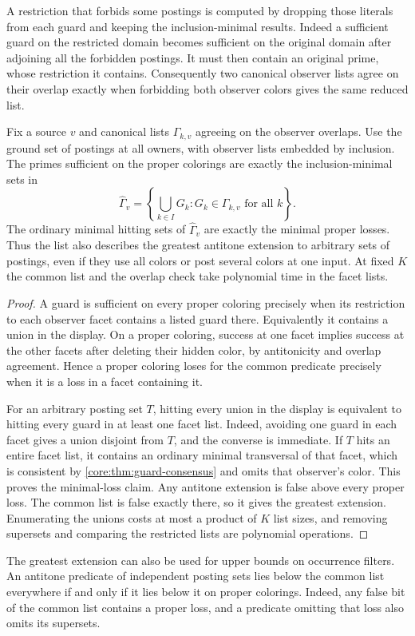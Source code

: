 A restriction that forbids some postings is computed by dropping
those literals from each guard and keeping the inclusion-minimal results.
Indeed a sufficient guard on the restricted domain becomes sufficient
on the original domain after adjoining all the forbidden postings.
It must then contain an original prime, whose restriction it contains.
Consequently two canonical observer lists agree on their overlap
exactly when forbidding both observer colors gives the same reduced list.

\begin{corollary}\label{core:cor:common-prime-list}
Fix a source $v$ and canonical lists $\Gamma_{k,v}$ agreeing on the
observer overlaps. Use the ground set of postings at all owners, with
observer lists embedded by inclusion. The primes sufficient on the
proper colorings are exactly the inclusion-minimal sets in
\[
 \widehat\Gamma_v=\left\{\bigcup_{k\in I}G_k:
                             G_k\in\Gamma_{k,v}\text{ for all }k\right\}.
\]
The ordinary minimal hitting sets of $\widehat\Gamma_v$ are exactly the
minimal proper losses. Thus the list also describes the greatest
antitone extension to arbitrary sets of postings, even if they use
all colors or post several colors at one input. At fixed $K$ the common
list and the overlap check take polynomial time in the facet lists.
\end{corollary}
\begin{proof}
A guard is sufficient on every proper coloring precisely when its
restriction to each observer facet contains a listed guard there.
Equivalently it contains a union in the display. On a proper coloring,
success at one facet implies success at the other facets after
deleting their hidden color, by antitonicity and overlap agreement.
Hence a proper coloring loses for the common predicate precisely when
it is a loss in a facet containing it.

For an arbitrary posting set $T$, hitting every union in the display
is equivalent to hitting every guard in at least one facet list.
Indeed, avoiding one guard in each facet gives a union disjoint from
$T$, and the converse is immediate. If $T$ hits an entire facet list,
it contains an ordinary minimal transversal of that facet, which is
consistent by \cref{core:thm:guard-consensus} and omits that observer's
color. This proves the minimal-loss claim. Any antitone extension is
false above every proper loss. The common list is false exactly there,
so it gives the greatest extension. Enumerating the unions costs at
most a product of $K$ list sizes, and removing supersets and comparing
the restricted lists are polynomial operations.
\end{proof}

The greatest extension can also be used for upper bounds on occurrence
filters. An antitone predicate of independent posting sets lies below
the common list everywhere if and only if it lies below it on proper
colorings. Indeed, any false bit of the common list contains a proper
loss, and a predicate omitting that loss also omits its supersets.
